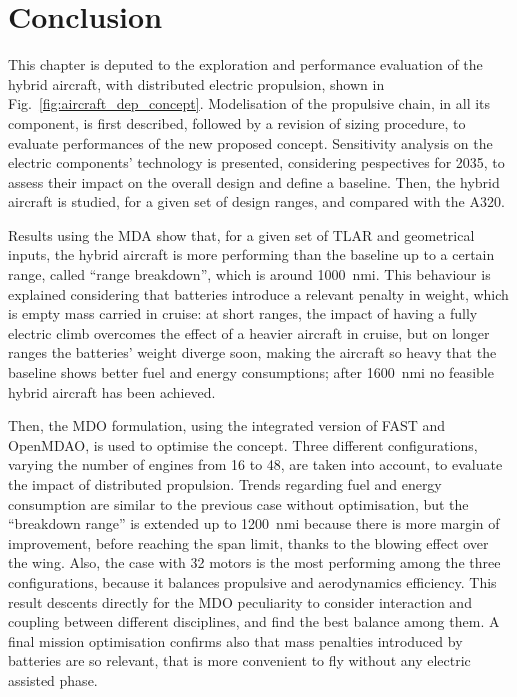 \section{Conclusion}
\label{sec:chap3_conclusion}

This chapter is deputed to the exploration and performance evaluation of the hybrid aircraft, with distributed electric propulsion, shown in Fig.~\ref{fig:aircraft_dep_concept}. 
Modelisation of the propulsive chain, in all its component, is first described, followed by a revision of sizing procedure, to evaluate performances of the new proposed concept. 
Sensitivity analysis on the electric components' technology is presented, considering pespectives for 2035, to assess their impact on the overall design and define a baseline. 
Then, the hybrid aircraft is studied, for a given set of design ranges, and compared with the A320. 

Results using the MDA show that, for a given set of TLAR and geometrical inputs, the hybrid aircraft is more performing than the baseline up to a certain range, called ``range breakdown'', which is around 1000~nmi.
This behaviour is explained considering that batteries introduce a relevant penalty in weight, which is empty mass carried in cruise: at short ranges, the impact of having a fully electric climb overcomes the effect of a heavier aircraft in cruise, but on longer ranges the batteries' weight diverge soon, making the aircraft so heavy that the baseline shows better fuel and energy consumptions; after 1600~nmi no feasible hybrid aircraft has been achieved. 

Then, the MDO formulation, using the integrated version of FAST and OpenMDAO, is used to optimise the concept. 
Three different configurations, varying the number of engines from 16 to 48, are taken into account, to evaluate the impact of distributed propulsion. 
Trends regarding fuel and energy consumption are similar to the previous case without optimisation, but the ``breakdown range'' is extended up to 1200~nmi because there is more margin of improvement, before reaching the span limit, thanks to the blowing effect over the wing. 
Also, the case with 32 motors is the most performing among the three configurations, because it balances propulsive and aerodynamics efficiency. 
This result descents directly for the MDO peculiarity to consider interaction and coupling between different disciplines, and find the best balance among them. 
A final mission optimisation confirms also that mass penalties introduced by batteries are so relevant, that is more convenient to fly without any electric assisted phase. 

